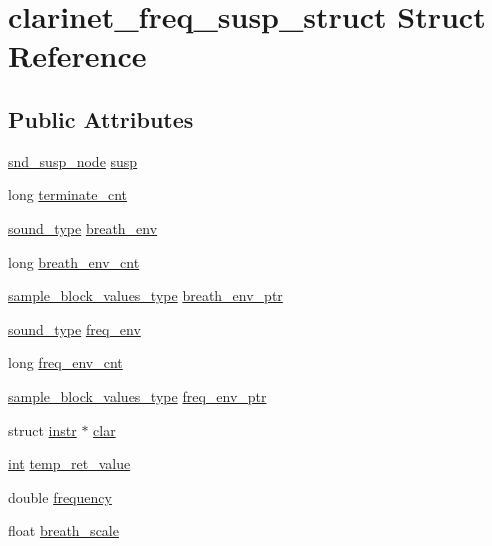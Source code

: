 \hypertarget{structclarinet__freq__susp__struct}{}\section{clarinet\+\_\+freq\+\_\+susp\+\_\+struct Struct Reference}
\label{structclarinet__freq__susp__struct}
\subsection*{Public Attributes}
\begin{DoxyCompactItemize}
\item 
\hyperlink{sound_8h_a6b268203688a934bd798ceb55f85d4c0}{snd\+\_\+susp\+\_\+node} \hyperlink{structclarinet__freq__susp__struct_ac06f86207e751f56459f6bd45295ed2f}{susp}
\item 
long \hyperlink{structclarinet__freq__susp__struct_ad4753740d649fc1d73e14946f3a03f03}{terminate\+\_\+cnt}
\item 
\hyperlink{sound_8h_a792cec4ed9d6d636d342d9365ba265ea}{sound\+\_\+type} \hyperlink{structclarinet__freq__susp__struct_a6861b0e7befbde083ba9d408378789f2}{breath\+\_\+env}
\item 
long \hyperlink{structclarinet__freq__susp__struct_a16be46236c223e13c0d85e8c41c3e3d0}{breath\+\_\+env\+\_\+cnt}
\item 
\hyperlink{sound_8h_a83d17f7b465d1591f27cd28fc5eb8a03}{sample\+\_\+block\+\_\+values\+\_\+type} \hyperlink{structclarinet__freq__susp__struct_a7baeb99ca0f994a3c93808019f80faa3}{breath\+\_\+env\+\_\+ptr}
\item 
\hyperlink{sound_8h_a792cec4ed9d6d636d342d9365ba265ea}{sound\+\_\+type} \hyperlink{structclarinet__freq__susp__struct_af37c1829b5593f7c8a17726d6402bc9d}{freq\+\_\+env}
\item 
long \hyperlink{structclarinet__freq__susp__struct_ac07046b1f8128f38d1188eda9887a710}{freq\+\_\+env\+\_\+cnt}
\item 
\hyperlink{sound_8h_a83d17f7b465d1591f27cd28fc5eb8a03}{sample\+\_\+block\+\_\+values\+\_\+type} \hyperlink{structclarinet__freq__susp__struct_a4f424713c24c3f67db1fe9b25a7ca9dd}{freq\+\_\+env\+\_\+ptr}
\item 
struct \hyperlink{structinstr}{instr} $\ast$ \hyperlink{structclarinet__freq__susp__struct_a59c209cae8b70baa99e226058634c3d4}{clar}
\item 
\hyperlink{xmltok_8h_a5a0d4a5641ce434f1d23533f2b2e6653}{int} \hyperlink{structclarinet__freq__susp__struct_aabff09b8193ed502f1f8665bf4179a37}{temp\+\_\+ret\+\_\+value}
\item 
double \hyperlink{structclarinet__freq__susp__struct_a20b7ea665b5a06815249478eab914ba6}{frequency}
\item 
float \hyperlink{structclarinet__freq__susp__struct_a6f91d3eba2269ac5791be5c46c4874ff}{breath\+\_\+scale}
\end{DoxyCompactItemize}


